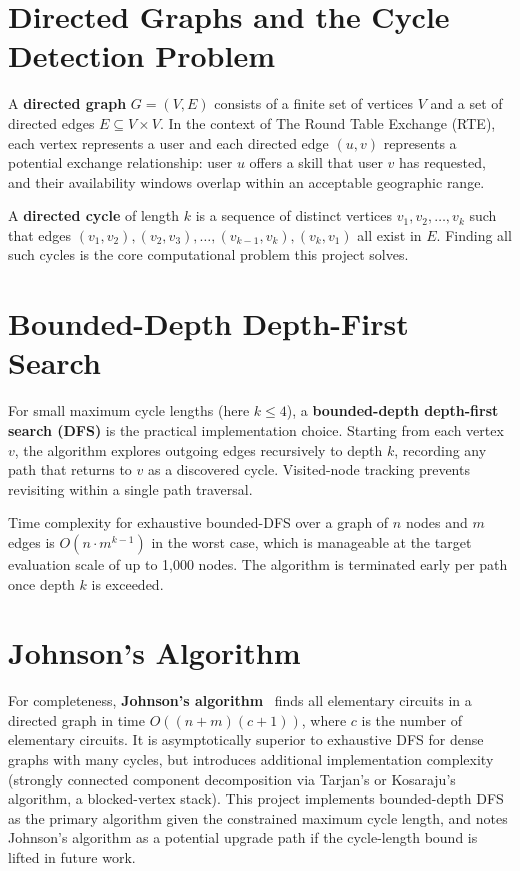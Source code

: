 \section{Directed Graphs and the Cycle Detection Problem}

A \textbf{directed graph} $G = (V, E)$ consists of a finite set of vertices $V$ and a
set of directed edges $E \subseteq V \times V$. In the context of The Round Table Exchange (RTE), each vertex
represents a user and each directed edge $(u, v)$ represents a potential exchange
relationship: user $u$ offers a skill that user $v$ has requested, and their availability
windows overlap within an acceptable geographic range.

A \textbf{directed cycle} of length $k$ is a sequence of distinct vertices
$v_1, v_2, \ldots, v_k$ such that edges $(v_1,v_2), (v_2,v_3), \ldots, (v_{k-1},v_k),
(v_k, v_1)$ all exist in $E$. Finding all such cycles is the core computational problem
this project solves.

\section{Bounded-Depth Depth-First Search}

For small maximum cycle lengths (here $k \leq 4$), a \textbf{bounded-depth
depth-first search (DFS)} is the practical implementation choice. Starting from each
vertex $v$, the algorithm explores outgoing edges recursively to depth $k$, recording
any path that returns to $v$ as a discovered cycle. Visited-node tracking prevents
revisiting within a single path traversal.

Time complexity for exhaustive bounded-DFS over a graph of $n$ nodes and $m$ edges is
$O(n \cdot m^{k-1})$ in the worst case, which is manageable at the target evaluation
scale of up to 1,000 nodes. The algorithm is terminated early per path once depth $k$
is exceeded.

\section{Johnson's Algorithm}

For completeness, \textbf{Johnson's algorithm}~\cite{johnson1975finding} finds all
elementary circuits in a directed graph in time $O((n + m)(c + 1))$, where $c$ is the
number of elementary circuits. It is asymptotically superior to exhaustive DFS for dense
graphs with many cycles, but introduces additional implementation complexity (strongly
connected component decomposition via Tarjan's or Kosaraju's algorithm, a blocked-vertex
stack). This project implements bounded-depth DFS as the primary algorithm given the
constrained maximum cycle length, and notes Johnson's algorithm as a potential upgrade
path if the cycle-length bound is lifted in future work.

